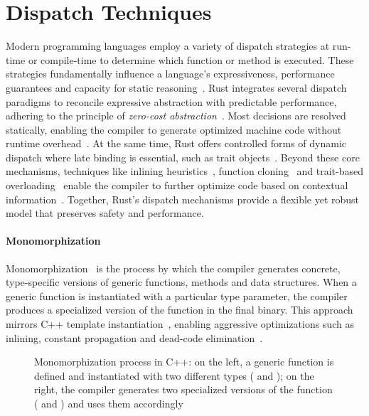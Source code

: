 
\section{Dispatch Techniques}\label{sec:dispatch}
Modern programming languages employ a variety of dispatch strategies at run-time or compile-time to determine which function or method is executed.
These strategies fundamentally influence a language's expressiveness, performance guarantees and capacity for static reasoning~\cite{Cardelli85,Milner78}.
Rust integrates several dispatch paradigms to reconcile expressive abstraction with predictable performance, adhering to the principle of \textit{zero-cost abstraction}~\cite{Steele90,Stroustrup05}.
Most decisions are resolved statically, enabling the compiler to generate optimized machine code without runtime overhead~\cite{Aho06,Cytron91}.
At the same time, Rust offers controlled forms of dynamic dispatch where late binding is essential, such as trait objects~\cite{Matsakis14}.
Beyond these core mechanisms, techniques like inlining heuristics~\cite{Cavazos05}, function cloning~\cite{Das03} and trait-based overloading~\cite{Stuckey05} enable the compiler to further optimize code based on contextual information~\cite{Chang97,Wegman85}.
Together, Rust's dispatch mechanisms provide a flexible yet robust model that preserves safety and performance.

\paragraph{Monomorphization}
Monomorphization~\cite{Griesemer2020FeatherweightG} is the process by which the compiler generates concrete, type-specific versions of generic functions, methods and data structures.
When a generic function is instantiated with a particular type parameter, the compiler produces a specialized version of the function in the final binary.
This approach mirrors C++ template instantiation~\cite{Vandevoorde02}, enabling aggressive optimizations such as inlining, constant propagation and dead-code elimination~\cite{Aho06,Wegman85,Cytron91}.

\begin{figure}[htbp!]
	\centering
	\begin{minipage}{0.49\textwidth}
		\centering
	\end{minipage}
	\hfill
	\begin{minipage}{0.49\textwidth}
		\centering
	\end{minipage}
	\captionsetup{type=listing,skip=2pt}
	\caption{Monomorphization process in C++: on the left, a generic function  is defined and instantiated with two different types ( and ); on the right, the compiler generates two specialized versions of the function ( and ) and uses them accordingly}
	\label{fig:monomorphization}
\end{figure}

